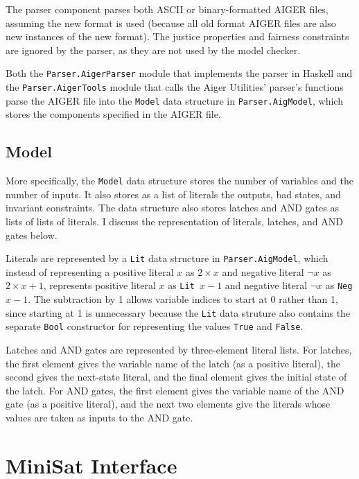 \documentclass[12pt,a4paper,twoside,openright]{report}
\begin{document}
{The parser component parses both ASCII or binary-formatted AIGER files,
assuming the new format is used (because all old format AIGER files are also
new instances of the new format). The justice properties and fairness constraints
are ignored by the parser, as they are not used by the model checker.

Both the \verb,Parser.AigerParser, module that implements the parser in Haskell and
the \verb,Parser.AigerTools, module that calls the Aiger Utilities' parser's functions
parse the AIGER file into the \verb,Model, data structure in \verb,Parser.AigModel,,
which stores the components specified in the AIGER file.

\subsection{Model}

More specifically, the \verb,Model, data structure stores the number of variables and
the number of inputs. It also stores as a list of literals the outputs, bad states,
and invariant constraints. The data structure also stores latches and AND gates as
lists of lists of literals. I discuss the representation of literals, latches, and
AND gates below.

Literals are represented by a \verb,Lit, data structure in \verb,Parser.AigModel,,
which instead of representing a positive literal $x$ as $2 \times x$ and negative
literal $\neg x$ as $2 \times x + 1$, represents positive literal $x$ as
\verb,Lit ,$x - 1$ and negative literal $\neg x$ as \verb,Neg ,$x - 1$. The subtraction
by 1 allows variable indices to start at 0 rather than 1, since starting at 1 is
unnecessary because the \verb,Lit, data struture also contains the separate
\verb,Bool, constructor for representing the values \verb,True, and \verb,False,.

Latches and AND gates are represented by three-element literal lists.
For latches, the first element gives the variable name of the latch (as a positive literal),
the second gives the next-state literal, and the final element gives the initial state
of the latch. For AND gates, the first element gives the variable name of the AND gate
(as a positive literal), and the next two elements give the literals whose values are taken
as inputs to the AND gate.

\section{MiniSat Interface}

}
\end{document}
